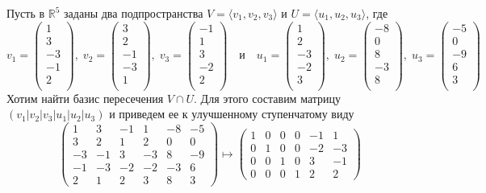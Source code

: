 \documentclass{article}
\begin{document}
Пусть в $\mathbb R^5$ заданы два подпространства $V = \langle v_1, v_2, v_3\rangle$ и $U = \langle u_1, u_2, u_3\rangle$, где
\[
v_{{1}} = \begin{pmatrix}
{1}\\
{3}\\
{-3}\\
{-1}\\
{2}\\
\end{pmatrix},\;v_{{2}} = \begin{pmatrix}
{3}\\
{2}\\
{-1}\\
{-3}\\
{1}\\
\end{pmatrix},\;v_{{3}} = \begin{pmatrix}
{-1}\\
{1}\\
{3}\\
{-2}\\
{2}\\
\end{pmatrix}
\quad
\text{и}
\quad
u_{{1}} = \begin{pmatrix}
{1}\\
{2}\\
{-3}\\
{-2}\\
{3}\\
\end{pmatrix},\;u_{{2}} = \begin{pmatrix}
{-8}\\
{0}\\
{8}\\
{-3}\\
{8}\\
\end{pmatrix},\;u_{{3}} = \begin{pmatrix}
{-5}\\
{0}\\
{-9}\\
{6}\\
{3}\\
\end{pmatrix}
\]
Хотим найти базис пересечения $V\cap U$. Для этого составим матрицу $(v_1|v_2|v_3|u_1|u_2|u_3)$ и приведем ее к улучшенному ступенчатому виду
\[
\left(
\begin{array}{ccc|ccc}
1&3&-1&1&-8&-5\\
3&2&1&2&0&0\\
-3&-1&3&-3&8&-9\\
-1&-3&-2&-2&-3&6\\
2&1&2&3&8&3
\end{array}
\right)
\mapsto
\left(
\begin{array}{ccc|ccc}
1&0&0&0&-1&1\\
0&1&0&0&-2&-3\\
0&0&1&0&3&-1\\
0&0&0&1&2&2
\end{array}
\right)
\]
\end{document}
